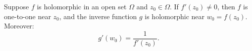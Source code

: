 Suppose $f$ is holomorphic in an open set $\Omega$ and $z_0 \in \Omega$. If $f'(z_0) \neq 0$, then $f$ is one-to-one near $z_0$, and the inverse function $g$ is holomorphic near $w_0 = f(z_0)$. Moreover:
\[
g'(w_0) = \frac{1}{f'(z_0)}.
\]
